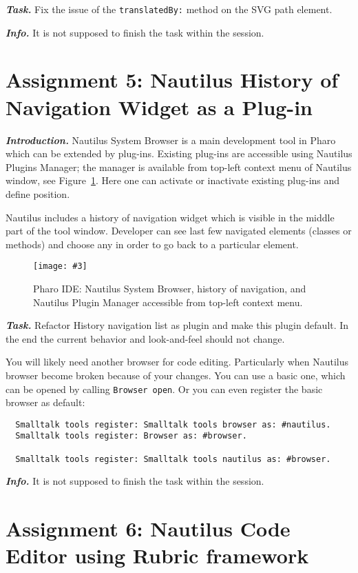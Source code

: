 \documentclass[table,a4paper]{article}
\newcommand{\figref}[1]{Figure~\ref{fig:#1}}
\newcommand{\myparagraph}[1]{\vspace{0.3em}\noindent \textbf{\textit{#1.}}}
\newcommand{\ct}[1]{\texttt{#1}}
\newcommand{\fig}[4]{
	\begin{figure}[#1]
		\centering
		\texttt{[image: \#3]}
		\caption{\label{fig:#3}#4}
	\end{figure}}
\begin{document}
\myparagraph{Task} Fix the issue of the \ct{translatedBy:} method on the SVG path element.

\myparagraph{Info} It is not supposed to finish the task within the session.

\clearpage{}

\section{Assignment 5: Nautilus History of Navigation Widget as a Plug-in}
\label{sec:a5}

\myparagraph{Introduction} Nautilus System Browser is a main development tool in Pharo which can be extended by plug-ins. Existing plug-ins are accessible using Nautilus Plugins Manager; the manager is available from top-left context menu of Nautilus window, see \figref{nautilus-history-list-and-plugin-manager}. Here one can activate or inactivate existing plug-ins and define position.

Nautilus includes a history of navigation widget which is visible in the middle part of the tool window. Developer can see last few navigated elements (classes or methods) and choose any in order to go back to a particular element.

\fig{h}{1}{nautilus-history-list-and-plugin-manager}{Pharo IDE: Nautilus System Browser, history of navigation, and
  Nautilus Plugin Manager accessible from top-left context menu.}

\myparagraph{Task} Refactor History navigation list as plugin and make this plugin default. In the end the current behavior and look-and-feel should not change.

You will likely need another browser for code editing. Particularly when Nautilus browser become broken because of your changes. You can use a basic one, which can be opened by calling \ct{Browser open}. Or you can even register the basic browser as default:

\begin{lstlisting}
  Smalltalk tools register: Smalltalk tools browser as: #nautilus.
  Smalltalk tools register: Browser as: #browser.  

  Smalltalk tools register: Smalltalk tools nautilus as: #browser.
\end{lstlisting}

\myparagraph{Info} It is not supposed to finish the task within the session.

\clearpage{}

\section{Assignment 6: Nautilus Code Editor using Rubric framework}
\label{sec:a6}
\end{document}
